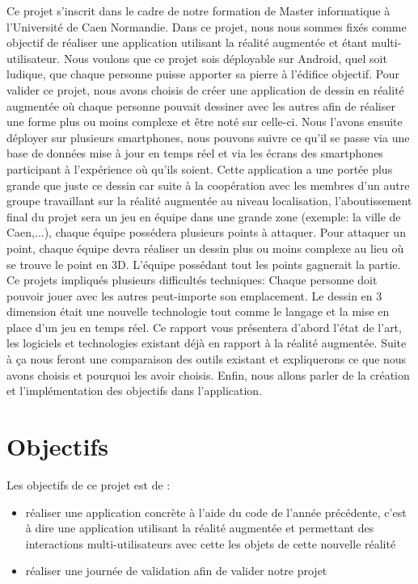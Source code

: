 \documentclass[12pt]{article}
\begin{document}
\medbreak

Ce projet s'inscrit dans le cadre de notre formation de Master informatique à l'Université de Caen Normandie. Dans ce projet, nous nous sommes fixés comme objectif de réaliser une application utilisant la réalité augmentée et  étant multi-utilisateur. Nous voulons que ce projet sois déployable sur Android, quel soit ludique, que chaque personne puisse apporter sa pierre à l'édifice objectif.
\medbreak
Pour valider ce projet, nous avons choisis de créer une application de dessin en réalité augmentée où chaque personne pouvait dessiner avec les autres afin de réaliser une forme plus ou moins complexe et être noté sur celle-ci. Nous l'avons ensuite déployer sur plusieurs smartphones, nous pouvons suivre ce qu'il se passe via une base de données mise à jour en temps réel et via les écrans des smartphones participant à l'expérience où qu'ils soient.
Cette application a une portée plus grande que juste ce dessin car suite à la coopération avec les membres d'un autre groupe travaillant sur la réalité augmentée au niveau localisation, l'aboutissement final du projet sera un jeu en équipe dans une grande zone (exemple: la ville de Caen,...), chaque équipe possédera plusieurs points à attaquer. Pour attaquer un point, chaque équipe devra réaliser un dessin plus ou moins complexe au lieu où se trouve le point en 3D. L'équipe possédant tout les points gagnerait la partie.
\medbreak
Ce projets impliqués plusieurs difficultés techniques: Chaque personne doit pouvoir jouer avec les autres peut-importe son emplacement. Le dessin en 3 dimension était une nouvelle technologie tout comme le langage et la mise en place d'un jeu en temps réel. 
\medbreak
Ce rapport vous présentera d'abord l'état de l'art, les logiciels et technologies existant déjà en rapport à la réalité augmentée. Suite à ça nous feront une comparaison des outils existant et expliquerons ce que nous avons choisis et pourquoi les avoir choisis. Enfin, nous allons parler de la création et l'implémentation des objectifs dans l'application.


\newpage

\section{Objectifs}
Les objectifs de ce projet est de :
\begin{itemize}
\item réaliser une application concrète à l'aide du code de l'année précédente, c'est à dire une application utilisant la réalité augmentée et permettant des interactions multi-utilisateurs avec cette les objets de cette nouvelle réalité
\item réaliser une journée de validation afin de valider notre projet
\end{itemize}
\end{document}
